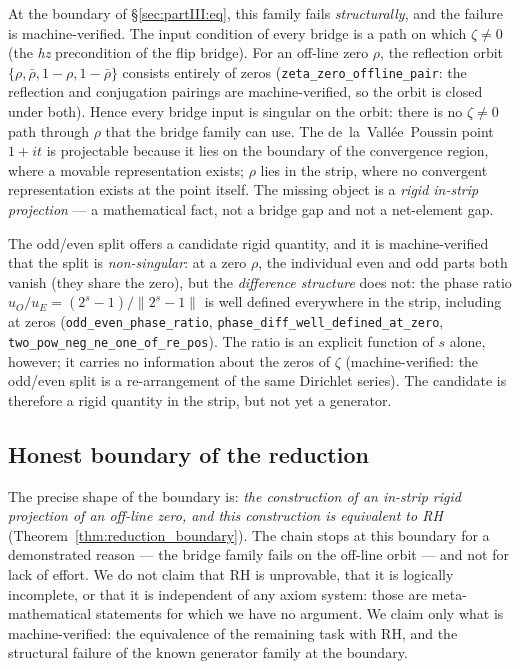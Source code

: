 \documentclass{article}
\newcommand{\zt}{\zeta}
\begin{document}
At the boundary of \S\ref{sec:partIII:eq}, this family fails
\emph{structurally}, and the failure is machine-verified. The input
condition of every bridge is a path on which $\zt\ne 0$ (the
\emph{hz} precondition of the flip bridge). For an off-line zero
$\rho$, the reflection orbit
$\{\rho,\bar\rho,1-\rho,1-\bar\rho\}$ consists entirely of zeros
(\texttt{zeta\_zero\_offline\_pair}: the reflection and conjugation
pairings are machine-verified, so the orbit is closed under both).
Hence every bridge input is singular on the orbit: there is no
$\zt\ne 0$ path through $\rho$ that the bridge family can use. The
de~la~Vall\'ee~Poussin point $1+it$ is projectable because it lies on
the boundary of the convergence region, where a movable representation
exists; $\rho$ lies in the strip, where no convergent representation
exists at the point itself. The missing object is a \emph{rigid
in-strip projection} --- a mathematical fact, not a bridge gap and not
a net-element gap.

The odd/even split offers a candidate rigid quantity, and it is
machine-verified that the split is \emph{non-singular}: at a zero
$\rho$, the individual even and odd parts both vanish (they share the
zero), but the \emph{difference structure} does not: the phase ratio
$u_O/u_E=(2^s-1)/\|2^s-1\|$ is well defined everywhere in the strip,
including at zeros (\texttt{odd\_even\_phase\_ratio},
\texttt{phase\_diff\_well\_defined\_at\_zero},
\texttt{two\_pow\_neg\_ne\_one\_of\_re\_pos}). The ratio is an explicit
function of $s$ alone, however; it carries no information about the
zeros of $\zt$ (machine-verified: the odd/even split is a
re-arrangement of the same Dirichlet series). The candidate is
therefore a rigid quantity in the strip, but not yet a generator.

\subsection{Honest boundary of the reduction}
\label{sec:partIII:honest}

The precise shape of the boundary is: \emph{the construction of an
in-strip rigid projection of an off-line zero, and this construction is
equivalent to RH} (Theorem~\ref{thm:reduction_boundary}). The chain
stops at this boundary for a demonstrated reason --- the bridge family
fails on the off-line orbit --- and not for lack of effort. We do not
claim that RH is unprovable, that it is logically incomplete, or that it
is independent of any axiom system: those are meta-mathematical
statements for which we have no argument. We claim only what is
machine-verified: the equivalence of the remaining task with RH, and the
structural failure of the known generator family at the boundary.
\end{document}
